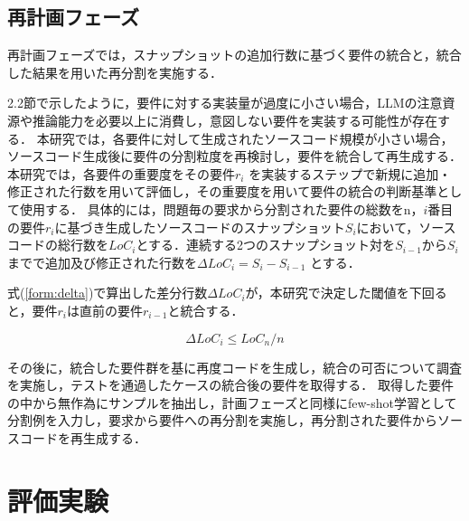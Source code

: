 \documentclass[submit,techrep,noauthor]{ipsj}
\begin{document}
\subsection{再計画フェーズ}
再計画フェーズでは，スナップショットの追加行数に基づく要件の統合と，統合した結果を用いた再分割を実施する．

2.2節で示したように，要件に対する実装量が過度に小さい場合，LLMの注意資源や推論能力を必要以上に消費し，意図しない要件を実装する可能性が存在する\cite{tosem}．
本研究では，各要件に対して生成されたソースコード規模が小さい場合，ソースコード生成後に要件の分割粒度を再検討し，要件を統合して再生成する．
本研究では，各要件の重要度をその要件$r_i$ を実装するステップで新規に追加・修正された行数を用いて評価し，その重要度を用いて要件の統合の判断基準として使用する．
具体的には，問題毎の要求から分割された要件の総数をn，$i$番目の要件$r_i$に基づき生成したソースコードのスナップショット$S_i$において，ソースコードの総行数を$LoC_i$とする．連続する2つのスナップショット対を$S_{i-1}$から$S_i$までで追加及び修正された行数を$\Delta LoC_i = S_i - S_{i-1}$ とする．

式(\ref{form:delta})で算出した差分行数$\Delta LoC_i$が，本研究で決定した閾値を下回ると，要件$r_i$は直前の要件$r_{i-1}$と統合する．

\begin{equation}\label{form:delta}
    \Delta LoC_i \leq LoC_n / n
\end{equation}

その後に，統合した要件群を基に再度コードを生成し，統合の可否について調査を実施し，テストを通過したケースの統合後の要件を取得する．
取得した要件の中から無作為にサンプルを抽出し，計画フェーズと同様にfew-shot学習として分割例を入力し，要求から要件への再分割を実施し，再分割された要件からソースコードを再生成する．


\section{評価実験}
\label{sec:evaluation}

\end{document}
